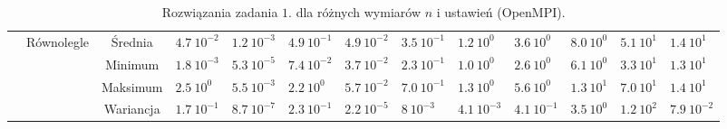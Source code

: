 \documentclass[11pt, a4paper, oneside]{article}
\begin{document}
\begin{table}[H]
\begin{adjustwidth}{-1.76cm}{}
\begin{tabular}{|c|c|c|l|l|l|l|l|l|l|l|l|l|}
                      & \multirow{4}{*}{Równolegle}   & Średnia   & $4.7 \ 10^{-2}$          & $1.2 \ 10^{-3}$         & $4.9 \ 10^{-1}$          & $4.9 \ 10^{-2}$         & $3.5 \ 10^{-1}$          & $1.2 \ 10^{0}$          & $3.6 \ 10^{0}$           & $8.0 \ 10^{0}$          & $5.1 \ 10^{1}$           & $1.4 \ 10^{1}$          \\ \cline{3-13} 
                      &                               & Minimum   & $1.8 \ 10^{-3}$          & $5.3 \ 10^{-5}$         & $7.4 \ 10^{-2}$          & $3.7 \ 10^{-2}$         & $2.3 \ 10^{-1}$          & $1.0 \ 10^{0}$          & $2.6 \ 10^{0}$           & $6.1 \ 10^{0}$          & $3.3 \ 10^{1}$           & $1.3 \ 10^{1}$          \\ \cline{3-13} 
                      &                               & Maksimum  & $2.5 \ 10^{0}$           & $5.5 \ 10^{-3}$         & $2.2 \ 10^{0}$           & $5.7 \ 10^{-2}$         & $7.0 \ 10^{-1}$          & $1.3 \ 10^{0}$          & $5.6 \ 10^{0}$           & $1.3 \ 10^{1}$          & $7.0 \ 10^{1}$           & $1.4 \ 10^{1}$          \\ \cline{3-13} 
                      &                               & Wariancja & $1.7 \ 10^{-1}$          & $8.7 \ 10^{-7}$         & $2.3 \ 10^{-1}$          & $2.2 \ 10^{-5}$         & $8 \ 10^{-3}$            & $4.1 \ 10^{-3}$         & $4.1 \ 10^{-1}$          & $3.5 \ 10^{0}$          & $1.2 \ 10^{2}$           & $7.9 \ 10^{-2}$         \\ \hline
\end{tabular}
\end{adjustwidth}
\caption{Rozwiązania zadania $1$. dla różnych wymiarów $n$ i ustawień (OpenMPI).}
\label{tab:MPI:zad_1}
\end{table}
\end{document}
